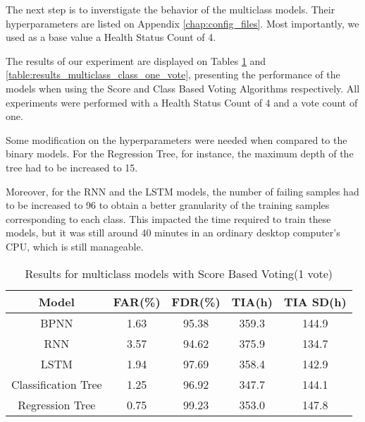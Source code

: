 The next step is to inverstigate the behavior of the multiclass models.
Their hyperparameters are listed on Appendix \ref{chap:config_files}.
Most importantly, we used as a base value a Health Status Count of 4.

The results of our experiment are displayed on Tables \ref{table:results_multiclass_score_one_vote} and \ref{table:results_multiclass_class_one_vote}, presenting the performance of the models when using the Score and Class Based Voting Algorithms respectively.
All experiments were performed with a Health Status Count of 4 and a vote count of one.

Some modification on the hyperparameters were needed when compared to the binary models.
For the Regression Tree, for instance, the maximum depth of the tree had to be increased to 15.

Moreover, for the RNN and the LSTM models, the number of failing samples had to be increased to 96 to obtain a better granularity of the training samples corresponding to each class.
This impacted the time required to train these models, but it was still around 40 minutes in an ordinary desktop computer's CPU, which is still manageable.

\begin{table}
  \begin{center}
    \begin{tabular}{|c|c|c|c|c|}
      \hline
    Model & FAR(\%) & FDR(\%) & TIA(h) & TIA SD(h) \\
    \hline
    BPNN & 1.63 & 95.38 & 359.3 & 144.9 \\
    RNN & 3.57 & 94.62 & 375.9 & 134.7 \\
    LSTM & 1.94 & 97.69 & 358.4 & 142.9 \\
    Classification Tree & 1.25 & 96.92 & 347.7 & 144.1 \\
    Regression Tree & 0.75 & 99.23 & 353.0 & 147.8 \\
    \hline
    \end{tabular}
    \caption[Results Multiclass Models, Score Voting, 1 vote]{Results for multiclass models with Score Based Voting(1 vote)}
    \label{table:results_multiclass_score_one_vote}
  \end{center}
\end{table}

